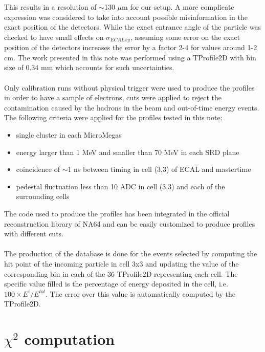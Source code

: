 This results in a resolution of $\sim$130 $\mu$m for our setup. A more
complicate expression was considered to take into account possible
misinformation in the exact position of the detectors. While the exact
entrance angle of the particle was checked to have small effects on
$\sigma_{ECALxy}$, assuming some error on the exact position of the
detectors increases the error by a factor 2-4 for values around 1-2
cm. The work presented in this note was performed using a TProfile2D
with bin size of 0.34 mm which accounts for such uncertainties.
\\
\\
Only calibration runs without physical trigger were used to produce
the profiles in order to have a sample of electrons, cuts were applied
to
reject the contamination caused by the hadrons in the beam and out-of-time energy events. \\
The following criteria were applied for the profiles tested in this
note:

\begin{itemize}
\item single cluster in each MicroMegas
\item energy larger than 1 MeV and smaller than 70 MeV in each SRD
  plane
\item coincidence of $\sim$1 ns between timing in cell (3,3) of ECAL
  and mastertime
\item pedestal fluctuation less than 10 ADC in cell (3,3) and each of
  the surrounding cells
\end{itemize}

The code used to produce the profiles
has been integrated in the official reconstruction library of NA64 and can
be easily customized to produce profiles with different cuts.
\\
\\
The production of the database is done for the events
selected by computing the hit point of the incoming particle in cell
3x3 and updating the value of the corresponding bin in each of the 36
TProfile2D representing each cell. The specific value filled is the
percentage of energy deposited in the cell, i.e. $100 \times E^i/E^{tot}$.
The error over this value is automatically computed by the TProfile2D.
\section{$\chi^2$ computation}
\label{chapter3:sec:chi2-comp}

